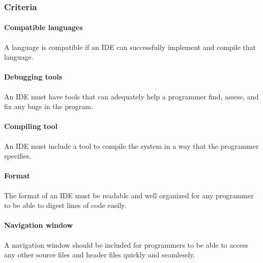 \subsubsection{Criteria}
\paragraph{Compatible languages}
A language is compatible if an IDE can successfully implement and compile that language.

\paragraph{Debugging tools}
An IDE must have tools that can adequately help a programmer find, assess, and fix any bugs in the program.

\paragraph{Compiling tool}
An IDE must include a tool to compile the system in a way that the programmer specifies.

\paragraph{Format}
The format of an IDE must be readable and well organized for any programmer to be able to digest lines of code easily.

\paragraph{Navigation window}
A navigation window should be included for programmers to be able to access any other source files and header files quickly and seamlessly.

